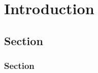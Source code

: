 
\chapter{Introduction}
\label{cha:intro}

\section{Section}
\label{sec:basis}

\subsection{Section}
\label{sec:framework}

